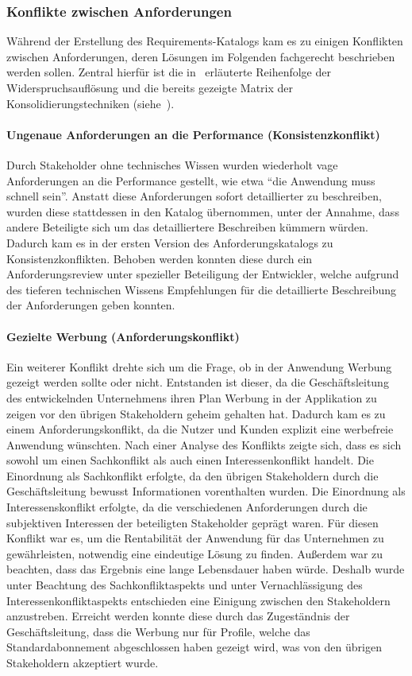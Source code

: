 \subsubsection{Konflikte zwischen Anforderungen}\label{subsubsec:conflicts}
Während der Erstellung des Requirements-Katalogs kam es zu einigen Konflikten zwischen Anforderungen, deren Lösungen im Folgenden
fachgerecht beschrieben werden sollen.
Zentral hierfür ist die in~ erläuterte Reihenfolge der Widerspruchsauflösung und die bereits
gezeigte Matrix der Konsolidierungstechniken (siehe~).

\paragraph{Ungenaue Anforderungen an die Performance (Konsistenzkonflikt)}
Durch Stakeholder ohne technisches Wissen wurden wiederholt vage Anforderungen an die Performance gestellt, wie etwa
\enquote{die Anwendung muss schnell sein}.
Anstatt diese Anforderungen sofort detaillierter zu beschreiben, wurden diese stattdessen in den Katalog übernommen, unter
der Annahme, dass andere Beteiligte sich um das detailliertere Beschreiben kümmern würden.
Dadurch kam es in der ersten Version des Anforderungskatalogs zu Konsistenzkonflikten.
Behoben werden konnten diese durch ein Anforderungsreview unter spezieller Beteiligung der Entwickler, welche aufgrund des
tieferen technischen Wissens Empfehlungen für die detaillierte Beschreibung der Anforderungen geben konnten.

\paragraph{Gezielte Werbung (Anforderungskonflikt)}
Ein weiterer Konflikt drehte sich um die Frage, ob in der Anwendung Werbung gezeigt werden sollte oder nicht.
Entstanden ist dieser, da die Geschäftsleitung des entwickelnden Unternehmens ihren Plan Werbung in der Applikation zu zeigen
vor den übrigen Stakeholdern geheim gehalten hat.
Dadurch kam es zu einem Anforderungskonflikt, da die Nutzer und Kunden explizit eine werbefreie Anwendung wünschten.
Nach einer Analyse des Konflikts zeigte sich, dass es sich sowohl um einen Sachkonflikt als auch einen Interessenkonflikt
handelt.
Die Einordnung als Sachkonflikt erfolgte, da den übrigen Stakeholdern durch die Geschäftsleitung bewusst Informationen
vorenthalten wurden.
Die Einordnung als Interessenskonflikt erfolgte, da die verschiedenen Anforderungen durch die subjektiven Interessen der
beteiligten Stakeholder geprägt waren.
Für diesen Konflikt war es, um die Rentabilität der Anwendung für das Unternehmen zu gewährleisten, notwendig eine eindeutige
Lösung zu finden.
Außerdem war zu beachten, dass das Ergebnis eine lange Lebensdauer haben würde.
Deshalb wurde unter Beachtung des Sachkonfliktaspekts und unter Vernachlässigung des Interessenkonfliktaspekts entschieden
eine Einigung zwischen den Stakeholdern anzustreben.
Erreicht werden konnte diese durch das Zugeständnis der Geschäftsleitung, dass die Werbung nur für Profile, welche das Standardabonnement
abgeschlossen haben gezeigt wird, was von den übrigen Stakeholdern akzeptiert wurde.

